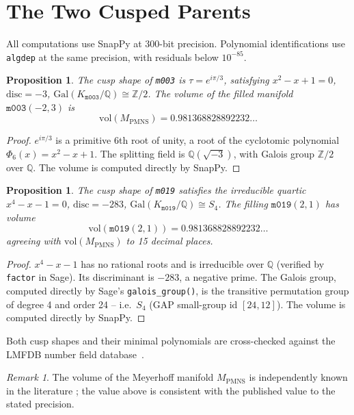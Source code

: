 \documentclass[11pt,a4paper]{article}
\newtheorem{proposition}[theorem]{Proposition}
\theoremstyle{definition}
\theoremstyle{remark}
\newtheorem{remark}[theorem]{Remark}
\newcommand{\Z}{\mathbb{Z}}
\newcommand{\Q}{\mathbb{Q}}
\newcommand{\mfld}[1]{\texttt{#1}}
\newcommand{\Gal}{\mathrm{Gal}}
\newcommand{\disc}{\mathrm{disc}}
\newcommand{\vol}{\mathrm{vol}}
\begin{document}
\section{The Two Cusped Parents}

All computations use SnapPy \cite{SnapPy} at 300-bit precision.
Polynomial identifications use \texttt{algdep} at the same
precision, with residuals below $10^{-85}$.

\begin{proposition}\label{prop:m003}
The cusp shape of \mfld{m003} is $\tau=e^{i\pi/3}$, satisfying
$x^2-x+1=0$, $\disc=-3$, $\Gal(K_{\mfld{m003}}/\Q)\cong\Z/2$.
The volume of the filled manifold $\mfld{m003}(-2,3)$ is
\[
\vol(M_{\mathrm{PMNS}}) = 0.981368828892232\ldots
\]
\end{proposition}

\begin{proof}
$e^{i\pi/3}$ is a primitive 6th root of unity, a root of the
cyclotomic polynomial $\Phi_6(x)=x^2-x+1$. The splitting field is
$\Q(\sqrt{-3})$, with Galois group $\Z/2$ over $\Q$. The volume
is computed directly by SnapPy.
\end{proof}

\begin{proposition}\label{prop:m019}
The cusp shape of \mfld{m019} satisfies the irreducible quartic
$x^4-x-1=0$, $\disc=-283$, $\Gal(K_{\mfld{m019}}/\Q)\cong S_4$.
The filling $\mfld{m019}(2,1)$ has volume
\[
\vol(\mfld{m019}(2,1)) = 0.981368828892232\ldots
\]
agreeing with $\vol(M_{\mathrm{PMNS}})$ to 15 decimal places.
\end{proposition}

\begin{proof}
$x^4-x-1$ has no rational roots and is irreducible over $\Q$
(verified by \texttt{factor} in Sage). Its discriminant is $-283$,
a negative prime. The Galois group, computed directly by Sage's
\texttt{galois\_group()}, is the transitive permutation group of
degree 4 and order 24 -- i.e.\ $S_4$ (GAP small-group id
$[24,12]$). The volume is computed directly by SnapPy.
\end{proof}

Both cusp shapes and their minimal polynomials are cross-checked
against the LMFDB number field database~\cite{LMFDB}.

\begin{remark}
The volume of the Meyerhoff manifold $M_{\mathrm{PMNS}}$ is
independently known in the literature \cite{GMM}; the value above
is consistent with the published value to the stated precision.
\end{remark}
\end{document}
